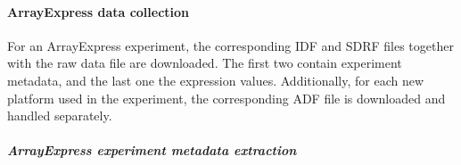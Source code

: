 





\paragraph{ArrayExpress data collection}

%
%

For an ArrayExpress experiment, the corresponding IDF and SDRF files
together with the raw data file are downloaded. The first two contain
experiment metadata, and the last one the expression values.
Additionally, for each new platform used in the experiment, the
corresponding ADF file is downloaded and handled separately.

\subparagraph{ArrayExpress experiment metadata extraction}

